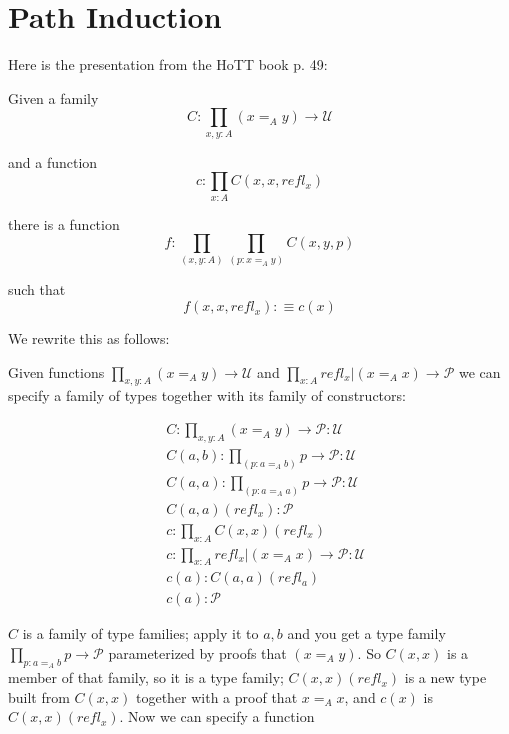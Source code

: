 \documentclass{article}
\begin{document}
\large

\section{Path Induction}

\noindent Here is the presentation from the HoTT book p. 49:

Given a family
\begin{equation}C:\prod_{x,y:A}(x=_Ay)\to\mathcal{U}\end{equation}

and a function
\begin{equation}
  c:\prod_{x:A}C(x,x,refl_x)
\end{equation}

there is a function
\begin{equation}
  f:\prod_{(x,y:A)}\prod_{(p:x=_Ay)}C(x,y,p)
\end{equation}

such that
\begin{equation}
  f(x,x,refl_x) :\equiv c(x)
\end{equation}

\noindent We rewrite this as follows:
\medskip

Given functions \(\prod_{x,y:A}(x=_Ay)\to\mathcal{U}\) and
\(\prod\limits_{x:A}refl_x\big\rvert(x=_Ax)\to\mathcal{P}\) we can
specify a family of types together with its family of constructors:

\begin{align}
  &C:\prod_{x,y:A}(x=_Ay)\to\mathcal{P:U} \\
  &C(a,b):\prod\limits_{(p:a=_Ab)}p\to\mathcal{P:U} \\
  &C(a,a):\prod\limits_{(p:a=_Aa)}p\to\mathcal{P:U} \\
  &C(a,a)(refl_x):\mathcal{P} \\
  &c:\prod_{x:A}C(x,x)(refl_x) \\
  &c:\prod\limits_{x:A}refl_x\big\rvert(x=_Ax)\to\mathcal{P:U} \\
  &c(a):C(a,a)(refl_a) \\
  &c(a):\mathcal{P}
\end{align}

\(C\) is a family of type families; apply it to \(a,b\) and you get a
type family \(\prod_{p:a=_Ab}p\to\mathcal{P}\) parameterized by proofs
that \((x=_Ay)\).  So \(C(x,x)\) is a member of that family, so it is
a type family; \(C(x,x)(refl_x)\) is a new type built from \(C(x,x)\)
together with a proof that \(x=_Ax\), and \(c(x)\) is
\(C(x,x)(refl_x)\).  Now we can specify a function
\end{document}
